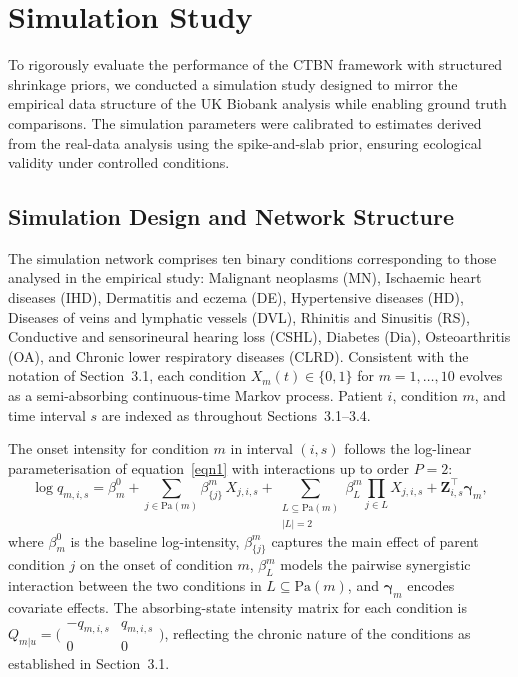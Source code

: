 \documentclass[12pt]{article}
\begin{document}
\section{Simulation Study}\label{sec:sim}

To rigorously evaluate the performance of the CTBN framework with structured shrinkage priors, we conducted a simulation study designed to mirror the empirical data structure of the UK Biobank analysis while enabling ground truth comparisons. The simulation parameters were calibrated to estimates derived from the real-data analysis using the spike-and-slab prior, ensuring ecological validity under controlled conditions.

\subsection{Simulation Design and Network Structure}

The simulation network comprises ten binary conditions corresponding to those analysed in the empirical study: Malignant neoplasms (MN), Ischaemic heart diseases (IHD), Dermatitis and eczema (DE), Hypertensive diseases (HD), Diseases of veins and lymphatic vessels (DVL), Rhinitis and Sinusitis (RS), Conductive and sensorineural hearing loss (CSHL), Diabetes (Dia), Osteoarthritis (OA), and Chronic lower respiratory diseases (CLRD). Consistent with the notation of Section~3.1, each condition $X_m(t) \in \{0,1\}$ for $m = 1, \dots, 10$ evolves as a semi-absorbing continuous-time Markov process. Patient $i$, condition $m$, and time interval $s$ are indexed as throughout Sections~3.1--3.4.

The onset intensity for condition $m$ in interval $(i,s)$ follows the log-linear parameterisation of equation~\eqref{eqn1} with interactions up to order $P = 2$:
\[
\log q_{m,i,s} = \beta^0_m + \sum_{j \in \mathrm{Pa}(m)} \beta^m_{\{j\}}\, X_{j,i,s} + \sum_{\substack{L \subseteq \mathrm{Pa}(m) \\ |L| = 2}} \beta^m_L \prod_{j \in L} X_{j,i,s} + \mathbf{Z}_{i,s}^\top \boldsymbol{\gamma}_m,
\]
where $\beta^0_m$ is the baseline log-intensity, $\beta^m_{\{j\}}$ captures the main effect of parent condition $j$ on the onset of condition $m$, $\beta^m_L$ models the pairwise synergistic interaction between the two conditions in $L \subseteq \mathrm{Pa}(m)$, and $\boldsymbol{\gamma}_m$ encodes covariate effects. The absorbing-state intensity matrix for each condition is $Q_{m|u} = \bigl(\begin{smallmatrix} -q_{m,i,s} & q_{m,i,s} \\ 0 & 0 \end{smallmatrix}\bigr)$, reflecting the chronic nature of the conditions as established in Section~3.1.
\end{document}
